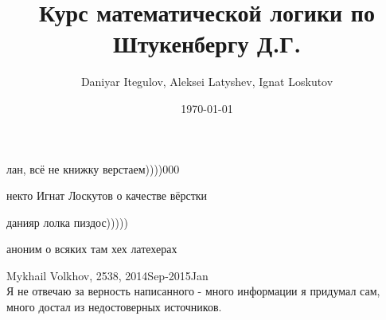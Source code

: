 \documentclass[fleqn,12pt]{article}
\author{Daniyar Itegulov, Aleksei Latyshev, Ignat Loskutov}
\date{\today}
\title{Курс математической логики по Штукенбергу Д.Г.}
\newcommand{\+}{\lambda}
\begin{document}
\theoremstyle{definition}
\newtheorem*{definition}{Определение}%
\newtheorem*{example}{Пример}
\newtheorem{theorem}{Теорема}[section]
\newtheorem{axiom}{Аксиома}[section]
\newtheorem{lemma}[theorem]{Лемма}

\maketitle
\tableofcontents

\epigraph{%
    лан, всё не книжку верстаем))))000}
  {некто Игнат Лоскутов о качестве вёрстки}  
\epigraph{%
    данияр лолка пиздос)))))}
  {аноним о всяких там хех латехерах}

Mykhail Volkhov, 2538, 2014Sep-2015Jan\\
Я не отвечаю за верность написанного - много информации
я придумал сам, много достал из недостоверных источников.










\end{document}
